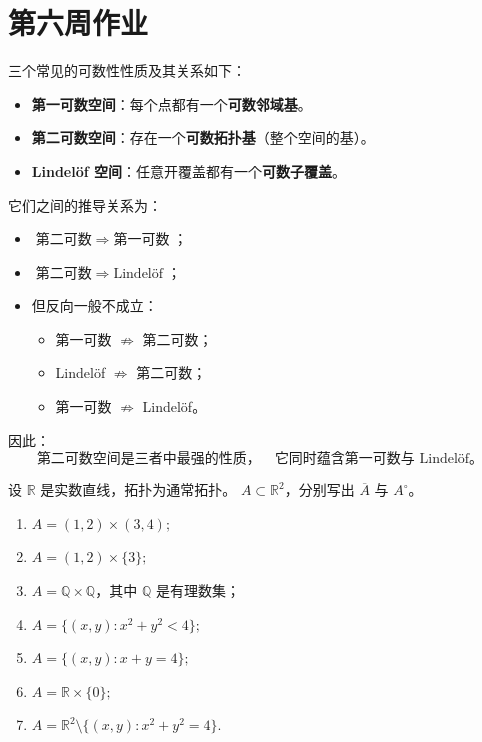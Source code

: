 \section{第六周作业}
\begin{dxtips}[ 判断是什么空间的标准]
三个常见的可数性性质及其关系如下：

\begin{itemize}
  \item \textbf{第一可数空间}：每个点都有一个\textbf{可数邻域基}。
  \item \textbf{第二可数空间}：存在一个\textbf{可数拓扑基}（整个空间的基）。
  \item \textbf{Lindelöf 空间}：任意开覆盖都有一个\textbf{可数子覆盖}。
\end{itemize}

它们之间的推导关系为：

\begin{itemize}
  \item $\text{第二可数} \;\Rightarrow\; \text{第一可数}$；
  \item $\text{第二可数} \;\Rightarrow\; \text{Lindelöf}$；
  \item 但反向一般不成立：
    \begin{itemize}
      \item 第一可数 $\not\Rightarrow$ 第二可数；
      \item Lindelöf $\not\Rightarrow$ 第二可数；
      \item 第一可数 $\not\Rightarrow$ Lindelöf。
    \end{itemize}
\end{itemize}

因此：
\[
\boxed{
\text{第二可数空间是三者中最强的性质，}
\quad
\text{它同时蕴含第一可数与 Lindelöf。}
}
\]

\end{dxtips}
\begin{homework}[第 7 题]
设 $\mathbb{R}$ 是实数直线，拓扑为通常拓扑。  
$A \subset \mathbb{R}^2$，分别写出 $\overline{A}$ 与 $A^\circ$。

\begin{enumerate}[(1)]
  \item $A = (1,2) \times (3,4);$
  \item $A = (1,2) \times \{3\};$
  \item $A = \mathbb{Q} \times \mathbb{Q}$，其中 $\mathbb{Q}$ 是有理数集；
  \item $A = \{(x,y): x^2 + y^2 < 4\};$
  \item $A = \{(x,y): x + y = 4\};$
  \item $A = \mathbb{R} \times \{0\};$
  \item $A = \mathbb{R}^2 \setminus \{(x,y): x^2 + y^2 = 4\}.$
\end{enumerate}
\end{homework}
